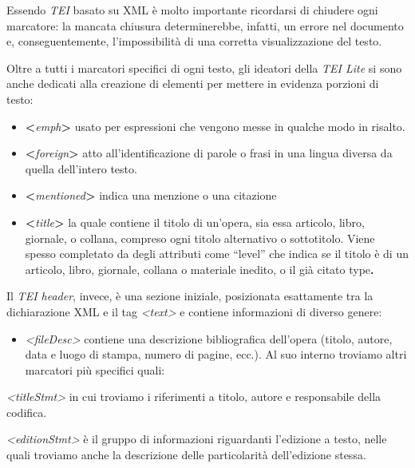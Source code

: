 \documentclass[
  b5paper,
  twoside,
  12pt,
  chapterprefix=false,
  bibliography=totocnumbered,
  parskip=false]{scrbook}
\providecommand{\tightlist}{%
  \setlength{\itemsep}{0pt}\setlength{\parskip}{0pt}}
\begin{document}
Essendo \emph{TEI} basato su XML è molto importante ricordarsi di chiudere
ogni marcatore: la mancata chiusura determinerebbe, infatti, un errore
nel documento e, conseguentemente, l'impossibilità di una corretta
visualizzazione del testo.

Oltre a tutti i marcatori specifici di ogni testo, gli ideatori della
\emph{TEI Lite} si sono anche dedicati alla creazione di elementi per mettere
in evidenza porzioni di testo:

\begin{itemize}
\item
  \textbf{\textless{}}\emph{emph}\textbf{\textgreater{}} usato per espressioni che vengono messe in
  qualche modo in risalto.
\item
  \textbf{\textless{}}\emph{foreign}\textbf{\textgreater{}} atto all'identificazione di parole o frasi in
  una lingua diversa da quella dell'intero testo.
\item
  \textbf{\textless{}}\emph{mentioned}\textbf{\textgreater{}} indica una menzione o una citazione
\item
  \textbf{\textless{}}\emph{title}\textbf{\textgreater{}} la quale contiene il titolo di un'opera, sia
  essa articolo, libro, giornale, o collana, compreso ogni titolo
  alternativo o sottotitolo. Viene spesso completato da degli
  attributi come \enquote{level} che indica se il titolo è di un articolo,
  libro, giornale, collana o materiale inedito, o il già citato
  type\textbf{.}
\end{itemize}

Il \emph{TEI header}, invece, è una sezione iniziale, posizionata esattamente
tra la dichiarazione XML e il tag \emph{\textless text\textgreater{}} e contiene informazioni di
diverso genere:

\begin{itemize}
\tightlist
\item
  \emph{\textless fileDesc\textgreater{}} contiene una descrizione bibliografica dell'opera
  (titolo, autore, data e luogo di stampa, numero di pagine, ecc.). Al
  suo interno troviamo altri marcatori più specifici quali:
\end{itemize}

\emph{\textless titleStmt\textgreater{}} in cui troviamo i riferimenti a titolo, autore e
responsabile della codifica.

\emph{\textless editionStmt\textgreater{}} è il gruppo di informazioni riguardanti l'edizione a
testo, nelle quali troviamo anche la descrizione delle particolarità
dell'edizione stessa.
\end{document}
